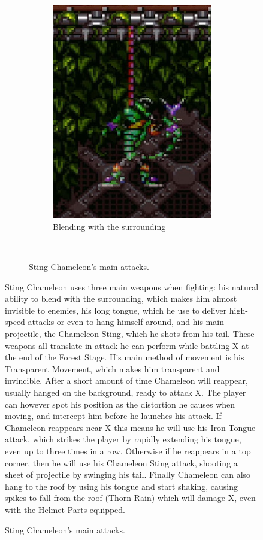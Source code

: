 \begin{figure}[htp]
\begin{figure}[htp]
\begin{subfigure}[t]{0.27\linewidth}
		\includegraphics[width=\linewidth]{figures/X1/Sting_chameleon/Chameleon_blend.jpg}
		\caption{Blending with the surrounding}
	\end{subfigure}\\
	\caption{Sting Chameleon's main attacks.}
\end{figure} 
Sting Chameleon uses three main weapons when fighting\cite{wiki:Sting_chameleon}: his natural ability to blend with the surrounding, which makes him almost invisible to enemies, his long tongue, which he use to deliver high-speed attacks or even to hang himself around, and his main projectile, the Chameleon Sting, which he shots from his tail. These weapons all translate in attack he can perform while battling X at the end of the Forest Stage. His main method of movement is his Transparent Movement, which makes him transparent and invincible. After a short amount of time Chameleon will reappear, usually hanged on the background, ready to attack X. The player can however spot his position as the distortion he causes when moving, and intercept him before he launches his attack. If Chameleon reappears near X this means he will use his Iron Tongue attack, which strikes the player by rapidly extending his tongue, even up to three times in a row. Otherwise if he reappears in a top corner, then he will use his Chameleon Sting attack, shooting a sheet of projectile by swinging his tail. Finally Chameleon can also hang to the roof by using his tongue and start shaking, causing spikes to fall from the roof (Thorn Rain) which will damage X, even with the Helmet Parts equipped.


\end{figure}
